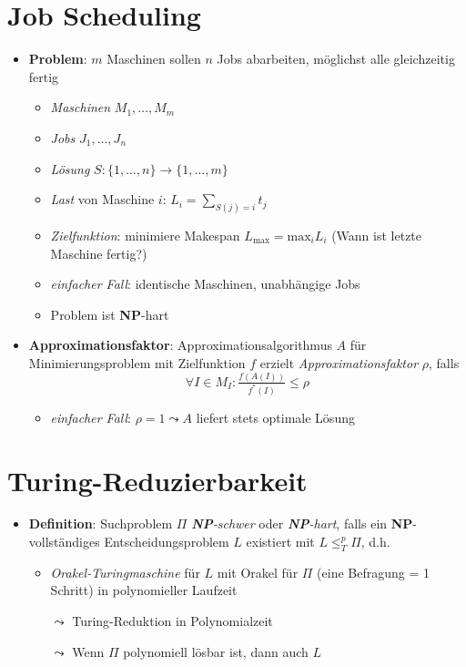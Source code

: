 \section{Job Scheduling}

\begin{itemize}
  \item \textbf{Problem}: $ m $ Maschinen sollen $ n $ Jobs abarbeiten, möglichst alle gleichzeitig fertig
  \begin{itemize}
    \item \emph{Maschinen} $ M_1, \dots, M_m $
    \item \emph{Jobs} $ J_1, \dots, J_n $
    \item \emph{Lösung} $ S: \{ 1,\dots,n \} \to \{ 1,\dots,m \} $
    \item \emph{Last} von Maschine $ i $: $ L_i = \sum_{S(j) = i}t_j $
    \item \emph{Zielfunktion}: minimiere Makespan $ L_\text{max} = \text{max}_iL_i $ (Wann ist letzte Maschine fertig?)
    \item \emph{einfacher Fall}: identische Maschinen, unabhängige Jobs
    \item Problem ist \textbf{NP}-hart
  \end{itemize}
  \item \textbf{Approximationsfaktor}: Approximationsalgorithmus $ A $ für Minimierungsproblem mit Zielfunktion $ f $ erzielt \emph{Approximationsfaktor} $ \rho $, falls
  \begin{equation*}
    \forall I \in M_I : \tfrac{f(A(I))}{f^*(I)} \leq \rho
  \end{equation*}
  \begin{itemize}
    \item \emph{einfacher Fall}: $ \rho = 1 \leadsto A $ liefert stets optimale Lösung
  \end{itemize}
\end{itemize}

\section{Turing-Reduzierbarkeit}

\begin{itemize}
  \item \textbf{Definition}: Suchproblem $ \Pi $ \emph{\textbf{NP}-schwer} oder \emph{\textbf{NP}-hart}, falls ein \textbf{NP}-vollständiges Entscheidungsproblem $ L $ existiert mit $ L \leq_T^p \Pi $, d.h.
  \begin{itemize}
    \item \emph{Orakel-Turingmaschine} für $ L $ mit Orakel für $ \Pi $ (eine Befragung = 1 Schritt) in polynomieller Laufzeit
    \item[$ \leadsto $] Turing-Reduktion in Polynomialzeit
    \item[$ \leadsto $] Wenn $ \Pi $ polynomiell lösbar ist, dann auch $ L $
  \end{itemize}
\end{itemize}

